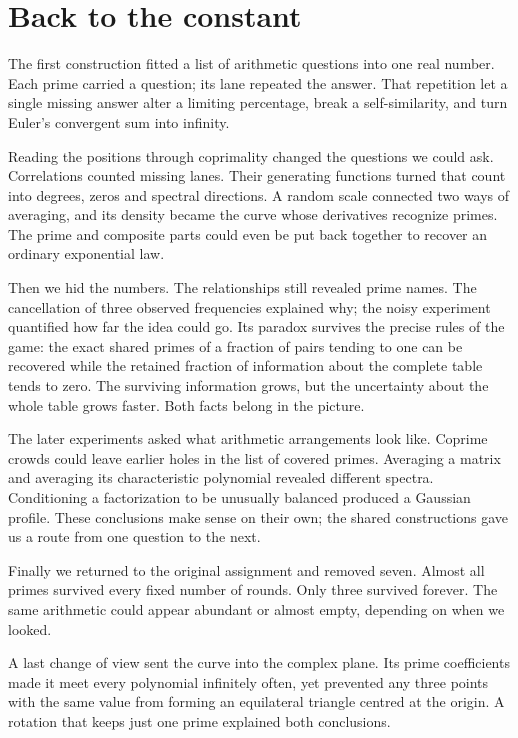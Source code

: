 \section{Back to the constant}\label{end:visible}

The first construction fitted a list of arithmetic questions into one
real number. Each prime carried a question; its lane repeated the answer.
That repetition let a single missing answer alter a limiting percentage,
break a self-similarity, and turn Euler's convergent sum into infinity.

Reading the positions through coprimality changed the questions we could
ask. Correlations counted missing lanes. Their generating functions
turned that count into degrees, zeros and spectral directions. A random
scale connected two ways of averaging, and its density became the curve
whose derivatives recognize primes. The prime and composite parts could
even be put back together to recover an ordinary exponential law.

Then we hid the numbers. The relationships still revealed prime names.
The cancellation of three observed frequencies explained why; the noisy
experiment quantified how far the idea could go. Its paradox survives
the precise rules of the game: the exact shared primes of a fraction of
pairs tending to one can be recovered while the retained fraction of
information about the complete table tends to zero. The surviving
information grows, but the uncertainty about the whole table grows
faster. Both facts belong in the picture.

The later experiments asked what arithmetic arrangements look like.
Coprime crowds could leave earlier holes in the list of covered primes.
Averaging a matrix and averaging its characteristic polynomial revealed
different spectra. Conditioning a factorization to be unusually balanced
produced a Gaussian profile. These conclusions make sense on their own;
the shared constructions gave us a route from one question to the next.

Finally we returned to the original assignment and removed seven.
Almost all primes survived every fixed number of rounds. Only three
survived forever. The same arithmetic could appear abundant or almost
empty, depending on when we looked.

A last change of view sent the curve into the complex plane. Its prime
coefficients made it meet every polynomial infinitely often, yet prevented
any three points with the same value from forming an equilateral triangle
centred at the origin. A rotation that keeps just one prime explained both
conclusions.

